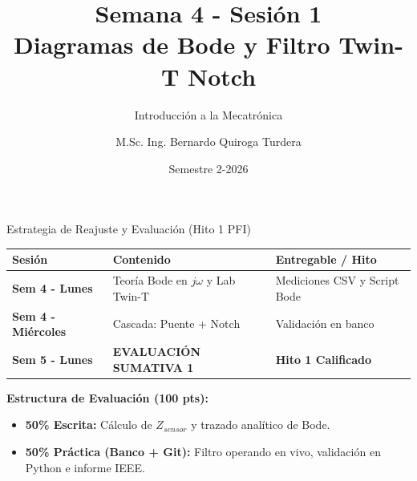 \documentclass[aspectratio=169, 10pt]{beamer}
\title[Bode y Twin-T Notch]{Semana 4 - Sesión 1\\Diagramas de Bode y Filtro Twin-T Notch}
\subtitle{Introducción a la Mecatrónica}
\author[M.Sc. Ing. B. Quiroga]{M.Sc. Ing. Bernardo Quiroga Turdera}
\institute[UCB Tarija]{Universidad Católica Boliviana ``San Pablo''}
\date{Semestre 2-2026}
\begin{document}
\begin{frame}
    \titlepage
\end{frame}

\begin{frame}{Estrategia de Reajuste y Evaluación (Hito 1 PFI)}
    \begin{table}[]
        \centering
        \small
        \begin{tabular}{lll}
            \toprule
            \textbf{Sesión} & \textbf{Contenido} & \textbf{Entregable / Hito} \\
            \midrule
            \textbf{Sem 4 - Lunes} & Teoría Bode en $j\omega$ y Lab Twin-T & Mediciones CSV y Script Bode \\
            \textbf{Sem 4 - Miércoles} & Cascada: Puente + Notch & Validación en banco \\
            \textbf{Sem 5 - Lunes} & \textbf{EVALUACIÓN SUMATIVA 1} & \textbf{Hito 1 Calificado} \\
            \bottomrule
        \end{tabular}
    \end{table}
    \vspace{0.3cm}
    \textbf{Estructura de Evaluación (100 pts):}
    \begin{itemize}
        \setlength{\itemsep}{2pt}
        \item \textbf{50\% Escrita:} Cálculo de $Z_{sensor}$ y trazado analítico de Bode.
        \item \textbf{50\% Práctica (Banco + Git):} Filtro operando en vivo, validación en Python e informe IEEE.
    \end{itemize}
\end{frame}
\end{document}
